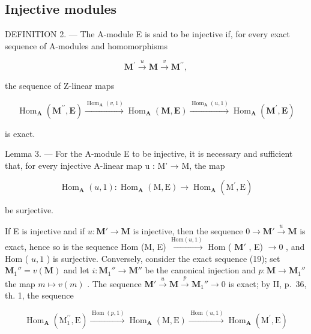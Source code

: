 \subsection{Injective modules}

DEFINITION 2. --- The A-module E is said to be injective if, for every exact sequence of A-modules and homomorphisms

\[
\mathbf {M} ^ {\prime} \xrightarrow {u} \mathbf {M} \xrightarrow {v} \mathbf {M} ^ {\prime \prime},\tag{19}
\]

the sequence of Z-linear maps

\[
\operatorname{Hom} _ {\mathbf {A}} \left(\mathbf {M} ^ {\prime \prime}, \mathbf {E}\right) \xrightarrow {\operatorname{Hom} _ {\mathbf {A}} (v , 1)} \operatorname{Hom} _ {\mathbf {A}} (\mathbf {M}, \mathbf {E}) \xrightarrow {\operatorname{Hom} _ {\mathbf {A}} (u , 1)} \operatorname{Hom} _ {\mathbf {A}} \left(\mathbf {M} ^ {\prime}, \mathbf {E}\right)\tag{20}
\]

is exact.

Lemma 3. --- For the A-module E to be injective, it is necessary and sufficient that, for every injective A-linear map u : M' → M, the map

\[
\operatorname{Hom} _ {\mathbf {A}} (u, 1): \operatorname{Hom} _ {\mathbf {A}} (\mathrm{M}, \mathrm{E}) \rightarrow \operatorname{Hom} _ {\mathbf {A}} (\mathrm{M} ^ {\prime}, \mathrm{E})
\]

be surjective.

If E is injective and if \(u: \mathbf{M}' \to \mathbf{M}\) is injective, then the sequence \(0 \to \mathbf{M}' \xrightarrow{u} \mathbf{M}\) is exact, hence so is the sequence Hom (M, E) \(\xrightarrow{\text{Hom}(u,1)}\) Hom ( \(\mathbf{M}'\) , E) \(\to 0\) , and Hom ( \(u,1\) ) is surjective. Conversely, consider the exact sequence (19); set \(\mathbf{M}_{1}'' = v(\mathbf{M})\) and let \(i: \mathbf{M}_{1}'' \to \mathbf{M}''\) be the canonical injection and \(p: \mathbf{M} \to \mathbf{M}_{1}''\) the map \(m \mapsto v(m)\) . The sequence \(\mathbf{M}' \xrightarrow{u} \mathbf{M} \xrightarrow{p} \mathbf{M}_{1}'' \to 0\) is exact; by II, p.~36, th. 1, the sequence

\[
\operatorname{Hom} _ {\mathbf {A}} \left(\mathrm{M} _ {1} ^ {\prime \prime}, \mathrm{E}\right) \xrightarrow {\operatorname{Hom} (p , 1)} \operatorname{Hom} _ {\mathbf {A}} (\mathrm{M}, \mathrm{E}) \xrightarrow {\operatorname{Hom} (u , 1)} \operatorname{Hom} _ {\mathbf {A}} \left(\mathrm{M} ^ {\prime}, \mathrm{E}\right)
\]

